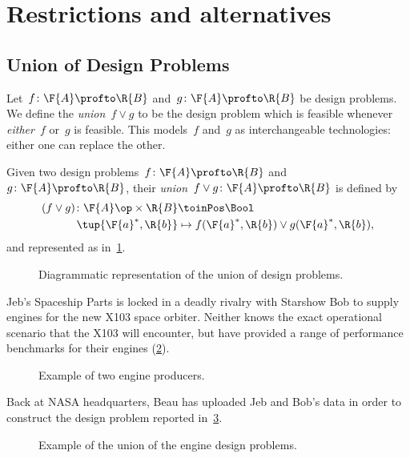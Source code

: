 

\section{Restrictions and alternatives}

\subsection{Union of Design Problems}
Let~$f\colon \F{A}\profto \R{B}$ and~$g\colon \F{A}\profto \R{B}$ be design problems. We define the \emph{union}~$f \vee g$ to be the design problem which is feasible whenever \emph{either}~$f$ or~$g$ is feasible.
This models~$f$ and~$g$ as interchangeable technologies: either one can replace the other.

\begin{definition}
  Given two design problems~$f \colon \F{A} \profto \R{B}$ and~$g \colon \F{A} \profto \R{B}$, their \emph{union}~$f \vee g \colon \F{A} \profto \R{B}$ is defined by
  \begin{equation}
    \begin{aligned}
    (f \vee g)
      \colon \F{A}\op \times \R{B} & \toinPos \Bool \\
      \tup{\F{a}^*, \R{b}} & \mapsto f(\F{a}^*, \R{b}) \vee g(\F{a}^*, \R{b}),
    \end{aligned}
  \end{equation}
  and represented as in~\cref{fig:uniondp}.
\end{definition}

\begin{figure}[h!]
  \begin{center}
  \end{center}
  \caption{Diagrammatic representation of the union of design problems. \label{fig:uniondp}}
\end{figure}

\begin{example}
  Jeb's Spaceship Parts is locked in a deadly rivalry with Starshow Bob to supply engines for the new X103 space orbiter. Neither knows the exact operational scenario that the X103 will encounter, but have provided a range of performance benchmarks for their engines (\cref{fig:exunion_1}).
  \begin{figure}[h!]
    \begin{center}
    \end{center}
    \caption{Example of two engine producers. \label{fig:exunion_1}}
  \end{figure}
  Back at NASA headquarters, Beau has uploaded Jeb and Bob's data in order to construct the design problem reported in~\cref{fig:exunion_2}.
  \begin{figure}[h!]
    \begin{center}
    \end{center}
    \caption{Example of the union of the engine design problems. \label{fig:exunion_2}}
  \end{figure}
\end{example}

